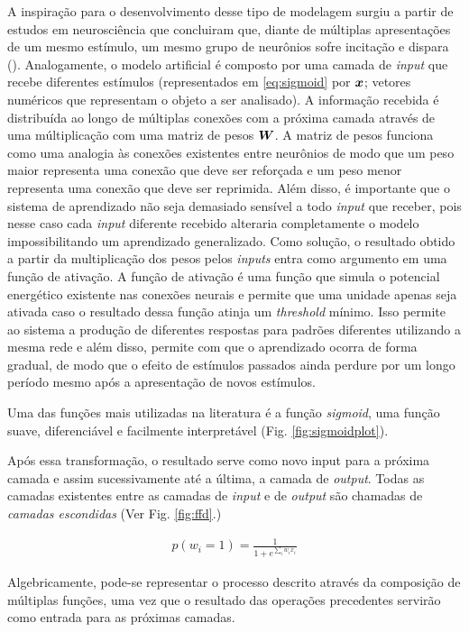 A inspiração para o desenvolvimento desse tipo de modelagem surgiu a partir de estudos em neurosciência %
que concluiram que, diante de múltiplas apresentações de um mesmo estímulo, um mesmo grupo de neurônios sofre incitação e dispara (\cite{hubel:1962}).  Analogamente, o modelo artificial é composto por uma camada de \textit{input} que recebe diferentes estímulos (representados em \ref{eq:sigmoid} por $\bm{x}$; vetores numéricos que representam o objeto a ser analisado). A informação recebida é distribuída ao longo de múltiplas conexões com a próxima camada através de uma múltiplicação com uma matriz de pesos $\bm{W}$. A matriz de pesos funciona como uma analogia às conexões existentes entre neurônios de modo que um peso maior representa uma conexão que deve ser reforçada e um peso menor representa uma conexão que deve ser reprimida. Além disso, é importante que o sistema de aprendizado não seja demasiado sensível a todo \textit{input} que receber, pois nesse caso cada \textit{input} diferente recebido alteraria completamente o modelo impossibilitando um aprendizado generalizado. Como solução, o resultado obtido a partir da multiplicação dos pesos pelos \textit{inputs} entra como argumento em uma função de ativação. A função de ativação é uma função que simula o potencial energético existente nas conexões neurais e permite que uma unidade apenas seja ativada caso o resultado dessa função atinja um \textit{threshold} mínimo. Isso permite ao sistema a produção de diferentes respostas para padrões diferentes utilizando a mesma rede e além disso, permite com que o aprendizado ocorra de forma gradual, de modo que o efeito de estímulos passados ainda perdure por um longo período mesmo após a apresentação de novos estímulos.


Uma das funções mais utilizadas na literatura é a função \textit{sigmoid}, uma função suave, diferenciável e facilmente interpretável (Fig. \ref{fig:sigmoidplot}). 

Após essa transformação, o resultado serve como novo input para a próxima camada e assim sucessivamente até a última, a camada de \textit{output}. Todas as camadas existentes entre as camadas de \textit{input} e de \textit{output} são chamadas de \textit{camadas escondidas} (Ver Fig. \ref{fig:ffd}.)

\begin{align}\label{eq:sigmoid}
p(w_{i} = 1) = \frac{1}{1+e^{\sum_{i} w_{i}x_{i}}}
\end{align}

Algebricamente, pode-se representar o processo descrito através da composição de múltiplas funções, uma vez que o resultado das operações precedentes servirão como entrada para as próximas camadas.

